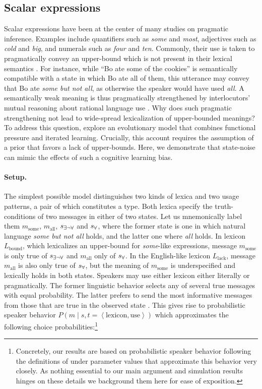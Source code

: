 \documentclass[10pt,a4paper]{article}
\newcommand{\tuple}[1]{\ensuremath{\left\langle #1 \right\rangle}}
\newcommand{\state}{\ensuremath{s}\xspace}		%
\newcommand{\mystate}[1]{\ensuremath{\state_{\text{#1}}}\xspace} %
\newcommand{\messg}{\ensuremath{m}\xspace}		%
\newcommand{\mymessg}[1]{\ensuremath{\messg_{\text{#1}}}\xspace} %
\newcommand{\ssome}{\mystate{\ensuremath{\exists\neg\forall}}}
\newcommand{\sall}{\mystate{\ensuremath{\forall}}}
\newcommand{\msome}{\mymessg{some}}
\newcommand{\mall}{\mymessg{all}}
\begin{document}
\subsection{Scalar expressions}
Scalar expressions have been at the center of many studies on pragmatic inference. Examples
include quantifiers such as {\em some} and {\em most}, adjectives such as {\em cold} and {\em
  big}, and numerals such as {\em four} and {\em ten}. Commonly, their use is taken to
pragmatically convey an upper-bound which is not present in their lexical semantics
\citep{horn:1972,gazdar:1979}. For instance, while ``Bo ate some of the cookies'' is
semantically compatible with a state in which Bo ate all of them, this utterance may convey
that Bo ate {\em some but not all}, as otherwise the speaker would have used {\em all}. A
semantically weak meaning is thus pragmatically strengthened by interlocutors' mutual reasoning
about rational language use \citep{grice:1975}. Why does such pragmatic strengthening not lead
to wide-spread lexicalization of upper-bounded meanings? To address this question, \citet{brochhagen+etal:2016:CogSci}
explore an evolutionary model that combines functional pressure and iterated learning.
Crucially, this account requires the assumption of a prior that favors a lack of
upper-bounds. Here, we demonstrate that state-noise can mimic the effects of such a cognitive
learning bias.

\paragraph{Setup.} The simplest possible model distinguishes two kinds of lexica and two
usage patterns, a pair of which constitutes a type. Both lexica specify the
truth-conditions of two messages in either of two states. Let us mnemonically label them
$\msome$, $\mall$, $\ssome$ and $\sall$, where the former state is one in which natural
language {\em some but not all} holds, and the latter one where {\em all} holds. In lexicon
$L_{\text{bound}}$, which lexicalizes an upper-bound for {\em some}-like expressions, message $\msome$ is only true of $\ssome$ and $\mall$ only of $\sall$. In
the English-like lexicon $L_{\text{lack}}$, message $\mall$ is also only true of $\sall$, but the
meaning of $\msome$ is underspecified and lexically holds in both states. Speakers may use
either lexicon either literally or pragmatically. The former linguistic behavior selects any of several true
messages with equal probability. The latter prefers to send the most informative messages from
those that are true in the observed state \citep{grice:1975}. This gives rise to probabilistic
speaker behavior $P(m \mid s,t= \tuple{\text{lexicon},\text{use}})$ which approximates the
following choice probabilities:\footnote{Concretely, our results are based on probabilistic speaker behavior
  following the definitions of \citet{brochhagen+etal:2016:CogSci} under parameter values that
  approximate this behavior very closely. As nothing essential to our main argument and
  simulation results hinges on these details we background them here for ease of
  exposition.}
\end{document}

